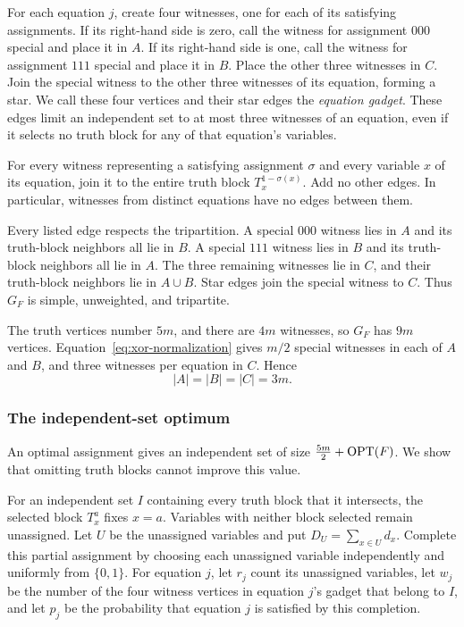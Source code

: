For each equation $j$, create four witnesses, one for each of its
satisfying assignments. If its right-hand side is zero, call the
witness for assignment $000$ special and place it in $A$. If its
right-hand side is one, call the witness for assignment $111$ special
and place it in $B$. Place the other three witnesses in $C$. Join the
special witness to the other three witnesses of its equation, forming
a star. We call these four vertices and their star edges the
\emph{equation gadget}. These edges limit an independent set to at most three witnesses
of an equation, even if it selects no truth block for any of that
equation's variables.

For every witness representing a satisfying assignment $\sigma$ and
every variable $x$ of its equation, join it to the entire truth block
$T_x^{1-\sigma(x)}$. Add no other edges. In particular, witnesses
from distinct equations have no edges between them.

Every listed edge respects the tripartition. A special $000$ witness
lies in $A$ and its truth-block neighbors all lie in $B$. A special
$111$ witness lies in $B$ and its truth-block neighbors all lie in
$A$. The three remaining witnesses lie in $C$, and their truth-block
neighbors lie in $A\cup B$. Star edges join the special witness to
$C$. Thus $G_F$ is simple, unweighted, and tripartite.

The truth vertices number $5m$, and there are $4m$ witnesses, so
$G_F$ has $9m$ vertices. Equation~\eqref{eq:xor-normalization}
gives $m/2$ special witnesses in each of $A$ and $B$, and three
witnesses per equation in $C$. Hence
\begin{equation}\label{eq:xor-equal-parts}
 |A|=|B|=|C|=3m.
\end{equation}

\subsubsection{The independent-set optimum}

An optimal assignment gives an independent set of size $\frac{5m}{2}+\operatorname{OPT}(F)$.
We show that omitting truth blocks cannot improve this value.

For an independent set $I$ containing every truth block that it
intersects, the selected block $T_x^a$ fixes $x=a$. Variables with neither
block selected remain unassigned. Let $U$ be the unassigned variables
and put $D_U=\sum_{x\in U}d_x$. Complete this partial assignment by
choosing each unassigned variable independently and uniformly from
$\{0,1\}$. For equation $j$, let $r_j$ count its unassigned variables,
let $w_j$ be the number of the four witness vertices in equation $j$'s
gadget that belong to $I$, and let $p_j$ be the probability that
equation $j$ is satisfied by this completion.

